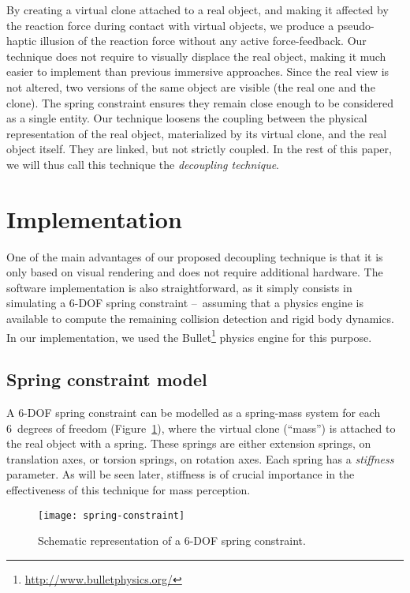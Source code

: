 \documentclass{vgtc}
\begin{document}
By creating a virtual clone attached to a real object, and making it affected by the reaction force during contact with virtual objects, we produce a pseudo-haptic illusion of the reaction force without any active force-feedback. Our technique does not require to visually displace the real object, making it much easier to implement than previous immersive approaches. Since the real view is not altered, two versions of the same object are visible (the real one and the clone). The spring constraint ensures they remain close enough to be considered as a single entity. Our technique loosens the coupling between the physical representation of the real object, materialized by its virtual clone, and the real object itself. They are linked, but not strictly coupled. In the rest of this paper, we will thus call this technique the \emph{decoupling technique}.

\section{Implementation}
\label{sec:implementation}

One of the main advantages of our proposed decoupling technique is that it is only based on visual rendering and does not require additional hardware. The software implementation is also straightforward, as it simply consists in simulating a 6-DOF spring constraint --~\mbox{assuming} that a physics engine is available to compute the remaining collision detection and rigid body dynamics. In our implementation, we used the Bullet\footnote{\url{http://www.bulletphysics.org/}} physics engine for this purpose.

\subsection{Spring constraint model}

A 6-DOF spring constraint can be modelled as a spring-mass system for each 6~degrees of freedom (Figure~\ref{fig:spring-constraint}), where the virtual clone (``mass'') is attached to the real object with a spring. These springs are either extension springs, on translation axes, or torsion springs, on rotation axes. Each spring has a \emph{stiffness} parameter. As will be seen later, stiffness is of crucial importance in the effectiveness of this technique for mass perception.

\begin{figure}[h]
  \centering
  \texttt{[image: spring-constraint]}
  \caption{Schematic representation of a 6-DOF spring constraint.}
  \label{fig:spring-constraint}
\end{figure}
\end{document}
